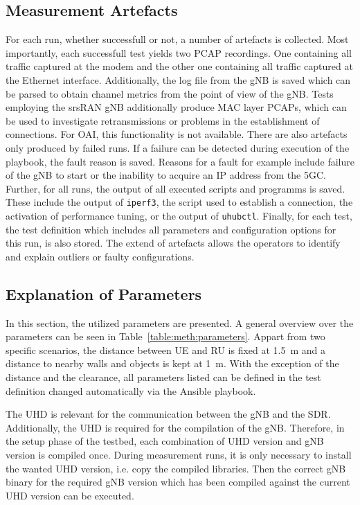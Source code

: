 \subsection{Measurement Artefacts}\label{sec:meth:artefacts}

For each run, whether successfull or not, a number of artefacts is collected.
Most importantly, each successfull test yields two PCAP recordings.
One containing all traffic captured at the modem and the other one containing all traffic captured at the Ethernet interface.
Additionally, the log file from the \gls{gNB} is saved which can be parsed to obtain channel metrics from the
point of view of the \gls{gNB}.
Tests employing the srsRAN \gls{gNB} additionally produce MAC layer PCAPs, which can be used to investigate
retransmissions or problems in the establishment of connections.
For \gls{OAI}, this functionality is not available.
There are also artefacts only produced by failed runs.
If a failure can be detected during execution of the playbook, the fault reason is saved.
Reasons for a fault for example include failure of the \gls{gNB} to start or the inability to acquire an IP address from the \gls{5GC}.
Further, for all runs, the output of all executed scripts and programms is saved.
These include the output of \texttt{iperf3}, the script used to establish a connection, the activation of performance tuning,
or the output of \texttt{uhubctl}.
Finally, for each test, the test definition which includes all parameters and configuration options for this run,
is also stored.
The extend of artefacts allows the operators to identify and explain outliers or faulty configurations.



\subsection{Explanation of Parameters}\label{sec:meth:parameters}

In this section, the utilized parameters are presented.
A general overview over the parameters can be seen in Table~\ref{table:meth:parameters}.
Appart from two specific scenarios, the distance between \gls{UE} and \gls{RU} is fixed at \SI{1.5}{\meter}
and a distance to nearby walls and objects is kept at \SI{1}{\meter}.
With the exception of the distance and the clearance, all parameters listed can be defined in the test definition
changed automatically via the Ansible playbook.

The \gls{UHD} is relevant for the communication between the \gls{gNB} and the \gls{SDR}.
Additionally, the \gls{UHD} is required for the compilation of the \gls{gNB}.
Therefore, in the setup phase of the testbed, each combination of \gls{UHD} version and \gls{gNB} version is
compiled once.
During measurement runs, it is only necessary to install the wanted \gls{UHD} version, i.e. copy the compiled libraries.
Then the correct \gls{gNB} binary for the required \gls{gNB} version which has been compiled against the current
\gls{UHD} version can be executed.

